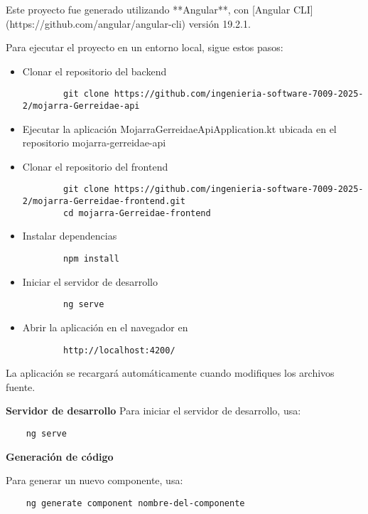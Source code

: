 

Este proyecto fue generado utilizando **Angular**, con [Angular CLI](https://github.com/angular/angular-cli) versión 19.2.1.

Para ejecutar el proyecto en un entorno local, sigue estos pasos:

\begin{itemize}
    \item Clonar el repositorio del backend 
    \begin{verbatim}
        git clone https://github.com/ingenieria-software-7009-2025-2/mojarra-Gerreidae-api
    \end{verbatim}
    \item Ejecutar la aplicación MojarraGerreidaeApiApplication.kt ubicada en el repositorio mojarra-gerreidae-api    
    \item Clonar el repositorio del frontend
    \begin{verbatim}
        git clone https://github.com/ingenieria-software-7009-2025-2/mojarra-Gerreidae-frontend.git
        cd mojarra-Gerreidae-frontend
    \end{verbatim}
    \item Instalar dependencias
    \begin{verbatim}
        npm install
    \end{verbatim}
    \item Iniciar el servidor de desarrollo
    \begin{verbatim}
        ng serve
    \end{verbatim}
    \item Abrir la aplicación en el navegador en
    \begin{verbatim}
        http://localhost:4200/
    \end{verbatim}
\end{itemize}  

La aplicación se recargará automáticamente cuando modifiques los archivos fuente.

\textbf{Servidor de desarrollo
}
Para iniciar el servidor de desarrollo, usa:

\begin{verbatim}
    ng serve
\end{verbatim}


\textbf{Generación de código}

Para generar un nuevo componente, usa:

\begin{verbatim}
    ng generate component nombre-del-componente
\end{verbatim}

